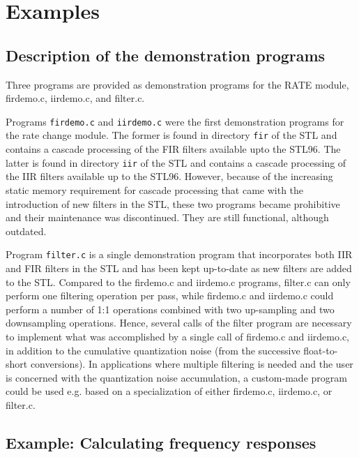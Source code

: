 \section {Examples} \label{Rate-exp}


\subsection {Description of the demonstration programs}

Three programs are provided as demonstration programs for the RATE module,
firdemo.c, iirdemo.c, and filter.c.

Programs {\tt firdemo.c} and {\tt iirdemo.c} were the first demonstration
programs for the rate change module. The former is found in directory
{\tt fir} of the STL and contains a cascade processing of the FIR
filters available upto the STL96. The latter is found in directory
{\tt iir} of the STL and contains a cascade processing of the IIR
filters available up to the STL96. However, because of the increasing
static memory requirement for cascade processing that came with the
introduction of new filters in the STL, these two programs became
prohibitive and their maintenance was discontinued. They are still
functional, although outdated.

Program {\tt filter.c} is a single demonstration program that incorporates both
IIR and FIR filters in the STL and has been kept up-to-date as new
filters are added to the STL. Compared to the firdemo.c and iirdemo.c
programs, filter.c can only perform one filtering operation per
pass, while firdemo.c and iirdemo.c could perform a number of 1:1
operations combined with two up-sampling and two downsampling
operations. Hence, several calls of the filter program are necessary
to implement what was accomplished by a single call of firdemo.c and
iirdemo.c, in addition to the cumulative quantization noise (from the
successive float-to-short conversions). In applications where multiple
filtering is needed and the user is concerned with the quantization
noise accumulation, a custom-made program could be used e.g. based on
a specialization of either firdemo.c, iirdemo.c, or filter.c.

\subsection {Example: Calculating frequency responses}

